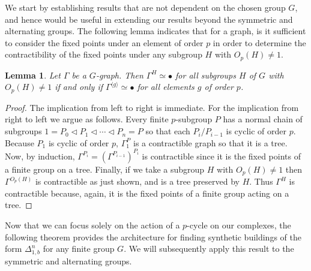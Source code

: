 \documentclass[12pt]{amsart}
\theoremstyle{plain}
\newtheorem{lemma}[theorem]{Lemma}
\theoremstyle{definition}
\theoremstyle{remark}
\numberwithin{equation}{section}
\begin{document}
We start by establishing results that are not dependent on the chosen group $G$, and hence would be useful in extending our results beyond the symmetric and alternating groups. The following lemma indicates that for a graph, is it sufficient to consider the fixed points under an element of order $p$ in order to determine the contractibility of the fixed points under any subgroup $H$ with $O_p(H)\ne 1$.

\begin{lemma}\label{lem:contractible_pelems}
Let $\Gamma$ be a $G$-graph. Then $\Gamma^H\simeq \bullet$ for all subgroups $H$ of $G$ with $O_p(H)\ne 1$ if and only if $\Gamma^{\langle g\rangle}\simeq \bullet$ for all elements $g$ of order $p$.
\end{lemma}
\begin{proof}
    The implication from left to right is immediate. For the implication from right to left we argue as follows. Every finite $p$-subgroup $P$ has a normal chain of subgroups $1=P_0\triangleleft P_1\triangleleft\cdots \triangleleft P_n=P$ so that each $P_i/P_{i-1}$ is cyclic of order $p$. Because $P_1$ is cyclic of order $p$, $\Gamma^P_1$ is a contractible graph so that it is a tree. Now, by induction, $\Gamma^{P_i}=(\Gamma^{P_{i-1}})^{P_i}$ is contractible since it is the fixed points of a finite group on a tree. Finally, if we take a subgroup $H$ with $O_p(H)\ne 1$ then $\Gamma^{O_p(H)}$ is contractible as just shown, and is a tree preserved by $H$. Thus $\Gamma^H$ is contractible because, again, it is the fixed points of a finite group acting on a tree.
\end{proof}

Now that we can focus solely on the action of a $p$-cycle on our complexes, the following theorem provides the architecture for finding synthetic buildings of the form $\Delta^n_{1,b}$ for any finite group $G$. We will subsequently apply this result to the symmetric and alternating groups.
\end{document}
